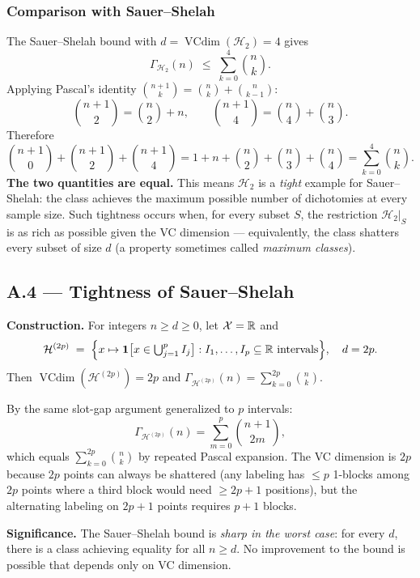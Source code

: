\documentclass{article}
\begin{document}
\subsubsection{Comparison with Sauer--Shelah}
 
The Sauer--Shelah bound with $d=\operatorname{VCdim}(\mathcal{H}_2)=4$ gives
\[
  \Gamma_{\mathcal{H}_2}(n)\;\le\;\sum_{k=0}^{4}\binom{n}{k}.
\]
Applying Pascal's identity $\binom{n+1}{k}=\binom{n}{k}+\binom{n}{k-1}$:
\[
  \binom{n+1}{2}=\binom{n}{2}+n,
  \qquad
  \binom{n+1}{4}=\binom{n}{4}+\binom{n}{3}.
\]
Therefore
\[
  \binom{n+1}{0}+\binom{n+1}{2}+\binom{n+1}{4}
  =1+n+\binom{n}{2}+\binom{n}{3}+\binom{n}{4}
  =\sum_{k=0}^{4}\binom{n}{k}.
\]
\textbf{The two quantities are equal.}
This means $\mathcal{H}_2$ is a \emph{tight} example for Sauer--Shelah: the
class achieves the maximum possible number of dichotomies at every sample size.
Such tightness occurs when, for every subset $S$, the restriction $\mathcal{H}_2|_S$
is as rich as possible given the VC dimension — equivalently, the class
shatters every subset of size $d$ (a property sometimes called \emph{maximum
classes}).
 
\subsection{A.4 --- Tightness of Sauer--Shelah}
 
\begin{summarybox}
\textbf{Construction.}
For integers $n\ge d\ge 0$, let $\mathcal{X}=\mathbb{R}$ and
\[
  \mathcal{H}^{(2p)}
  \;=\;
  \Bigl\{
    x\mapsto\mathbf{1}\bigl[x\in\textstyle\bigcup_{j=1}^{p}I_j\bigr]
    :I_1,\dots,I_p\subseteq\mathbb{R}\text{ intervals}
  \Bigr\},
  \quad d=2p.
\]
Then $\operatorname{VCdim}(\mathcal{H}^{(2p)})=2p$ and
$\Gamma_{\mathcal{H}^{(2p)}}(n)=\sum_{k=0}^{2p}\binom{n}{k}$.
\end{summarybox}
 
By the same slot-gap argument generalized to $p$ intervals:
\[
  \Gamma_{\mathcal{H}^{(2p)}}(n)
  =\sum_{m=0}^{p}\binom{n+1}{2m},
\]
which equals $\sum_{k=0}^{2p}\binom{n}{k}$ by repeated Pascal expansion.
The VC dimension is $2p$ because $2p$ points can always be shattered (any
labeling has $\le p$ 1-blocks among $2p$ points where a third block would
need $\ge2p+1$ positions), but the alternating labeling on $2p+1$ points
requires $p+1$ blocks.
 
\textbf{Significance.} The Sauer--Shelah bound is \emph{sharp in the worst
case}: for every $d$, there is a class achieving equality for all $n\ge d$.
No improvement to the bound is possible that depends only on VC dimension.
 
\end{document}
